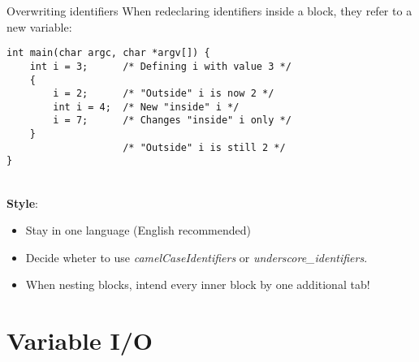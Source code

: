 \begin{frame}[fragile]{Overwriting identifiers}
	When redeclaring identifiers inside a block, they refer to a new variable:
	\begin{lstlisting}
int main(char argc, char *argv[]) {
	int i = 3;		/* Defining i with value 3 */
	{
		i = 2;		/* "Outside" i is now 2 */
		int i = 4;	/* New "inside" i */
		i = 7;		/* Changes "inside" i only */
	}
					/* "Outside" i is still 2 */
}
\end{lstlisting}\ \\
	\textbf{Style}:\\
	\begin{itemize}
		\item Stay in one language (English recommended)
		\item Decide wheter to use \textit{camelCaseIdentifiers} or
		 \textit{underscore\_identifiers}.\\
		\item When nesting blocks, intend every inner block by one additional tab!
	\end{itemize}
\end{frame}
\section{Variable I/O}

